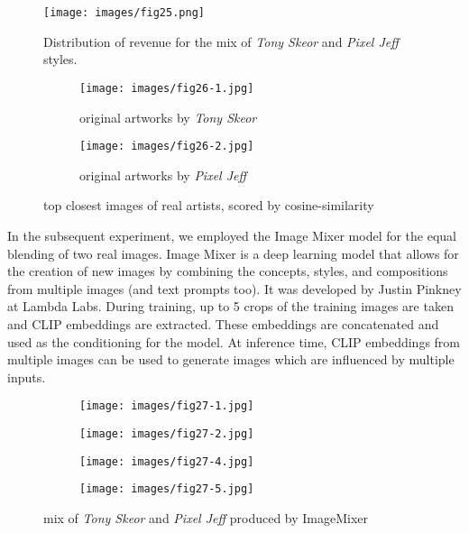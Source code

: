\documentclass[12pt, letterpaper]{article}
\begin{document}
\begin{figure}[h]
    \centering
    \texttt{[image: images/fig25.png]}
    \caption{Distribution of revenue for the mix of \textit{Tony Skeor} and \textit{Pixel Jeff} styles.}
    \label{fig25:image1}
\end{figure}

\begin{figure}[h]
    \centering
    
    \begin{subfigure}{0.48\textwidth}
        \centering
        \texttt{[image: images/fig26-1.jpg]}
        \caption{original artworks by \textit{Tony Skeor}}
        \label{fig26:first_image}
    \end{subfigure}
    \begin{subfigure}{0.48\textwidth}
        \centering
        \texttt{[image: images/fig26-2.jpg]}
        \caption{original artworks by \textit{Pixel Jeff}}
        \label{fig26:second_image}
    \end{subfigure}

    \caption{top closest images of real artists, scored by cosine-similarity}
    \label{fig26:all_images}    

\end{figure}

In the subsequent experiment, we employed the Image Mixer \cite{pinkney2022imagemixer} model for the equal blending of two real images. 
Image Mixer is a deep learning model that allows for the creation of new images by combining the concepts, styles, and compositions from multiple images (and text prompts too). It was developed by Justin Pinkney at Lambda Labs. During training, up to 5 crops of the training images are taken and CLIP embeddings are extracted. These embeddings are concatenated and used as the conditioning for the model. At inference time, CLIP embeddings from multiple images can be used to generate images which are influenced by multiple inputs.

\begin{figure}[h]
    \centering
    \begin{subfigure}{0.24\textwidth}
        \centering
        \texttt{[image: images/fig27-1.jpg]}
    \end{subfigure}
    \begin{subfigure}{0.24\textwidth}
        \centering
        \texttt{[image: images/fig27-2.jpg]}
    \end{subfigure}
    \begin{subfigure}{0.24\textwidth}
        \centering
        \texttt{[image: images/fig27-4.jpg]}
    \end{subfigure}
    \begin{subfigure}{0.24\textwidth}
        \centering
        \texttt{[image: images/fig27-5.jpg]}
    \end{subfigure}
    \caption{mix of \textit{Tony Skeor} and \textit{Pixel Jeff} produced by ImageMixer}
    \label{fig27:all_images}    
\end{figure}
\end{document}
